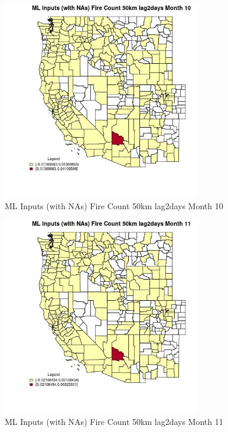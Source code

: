 \begin{figure} 
\centering  
\includegraphics[width=0.77\textwidth]{Code_Outputs/Report_ML_input_PM25_Step4_part_e_de_duplicated_aves_compiled_2019-05-20wNAs_CountyFire_Count_50km_lag2daysmedianMonth10.jpg} 
\caption{\label{fig:Report_ML_input_PM25_Step4_part_e_de_duplicated_aves_compiled_2019-05-20wNAsCountyFire_Count_50km_lag2daysmedianMonth10}ML Inputs (with NAs) Fire Count 50km lag2days Month 10} 
\end{figure} 
 

\begin{figure} 
\centering  
\includegraphics[width=0.77\textwidth]{Code_Outputs/Report_ML_input_PM25_Step4_part_e_de_duplicated_aves_compiled_2019-05-20wNAs_CountyFire_Count_50km_lag2daysmedianMonth11.jpg} 
\caption{\label{fig:Report_ML_input_PM25_Step4_part_e_de_duplicated_aves_compiled_2019-05-20wNAsCountyFire_Count_50km_lag2daysmedianMonth11}ML Inputs (with NAs) Fire Count 50km lag2days Month 11} 
\end{figure} 
 

